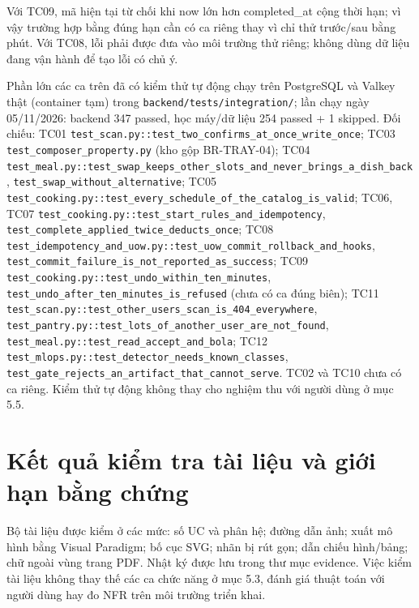 Với TC09, mã hiện tại từ chối khi now lớn hơn completed\_\allowbreak{}at cộng thời hạn; vì vậy trường hợp bằng đúng hạn cần có ca riêng thay vì chỉ thử trước/\allowbreak{}sau bằng phút. Với TC08, lỗi phải được đưa vào môi trường thử riêng; không dùng dữ liệu đang vận hành để tạo lỗi có chủ ý.

Phần lớn các ca trên đã có kiểm thử tự động chạy trên PostgreSQL và Valkey thật (container tạm) trong {\small\texttt{backend/\allowbreak{}tests/\allowbreak{}integration/\allowbreak{}}}; lần chạy ngày 05/11/2026: backend 347 passed, học máy/dữ liệu 254 passed + 1 skipped. Đối chiếu: TC01 {\small\texttt{test\_scan.py::\allowbreak{}test\_two\_confirms\_at\_once\_write\_once}}; TC03 {\small\texttt{test\_composer\_property.py}} (kho gộp BR-TRAY-04); TC04 {\small\texttt{test\_meal.py::\allowbreak{}test\_swap\_keeps\_other\_slots\_and\_never\_brings\_a\_dish\_back}}, {\small\texttt{test\_swap\_without\_alternative}}; TC05 {\small\texttt{test\_cooking.py::\allowbreak{}test\_every\_schedule\_of\_the\_catalog\_is\_valid}}; TC06, TC07 {\small\texttt{test\_cooking.py::\allowbreak{}test\_start\_rules\_and\_idempotency}}, {\small\texttt{test\_complete\_applied\_twice\_deducts\_once}}; TC08 {\small\texttt{test\_idempotency\_and\_uow.py::\allowbreak{}test\_uow\_commit\_rollback\_and\_hooks}}, {\small\texttt{test\_commit\_failure\_is\_not\_reported\_as\_success}}; TC09 {\small\texttt{test\_cooking.py::\allowbreak{}test\_undo\_within\_ten\_minutes}}, {\small\texttt{test\_undo\_after\_ten\_minutes\_is\_refused}} (chưa có ca đúng biên); TC11 {\small\texttt{test\_scan.py::\allowbreak{}test\_other\_users\_scan\_is\_404\_everywhere}}, {\small\texttt{test\_pantry.py::\allowbreak{}test\_lots\_of\_another\_user\_are\_not\_found}}, {\small\texttt{test\_meal.py::\allowbreak{}test\_read\_accept\_and\_bola}}; TC12 {\small\texttt{test\_mlops.py::\allowbreak{}test\_detector\_needs\_known\_classes}}, {\small\texttt{test\_gate\_rejects\_an\_artifact\_that\_cannot\_serve}}. TC02 và TC10 chưa có ca riêng. Kiểm thử tự động không thay cho nghiệm thu với người dùng ở mục 5.5.

\section{Kết quả kiểm tra tài liệu và giới hạn bằng chứng}
Bộ tài liệu được kiểm ở các mức: số UC và phân hệ; đường dẫn ảnh; xuất mô hình bằng Visual Paradigm; bố cục SVG; nhãn bị rút gọn; dẫn chiếu hình/\allowbreak{}bảng; chữ ngoài vùng trang PDF. Nhật ký được lưu trong thư mục evidence. Việc kiểm tài liệu không thay thế các ca chức năng ở mục 5.3, đánh giá thuật toán với người dùng hay đo NFR trên môi trường triển khai.

